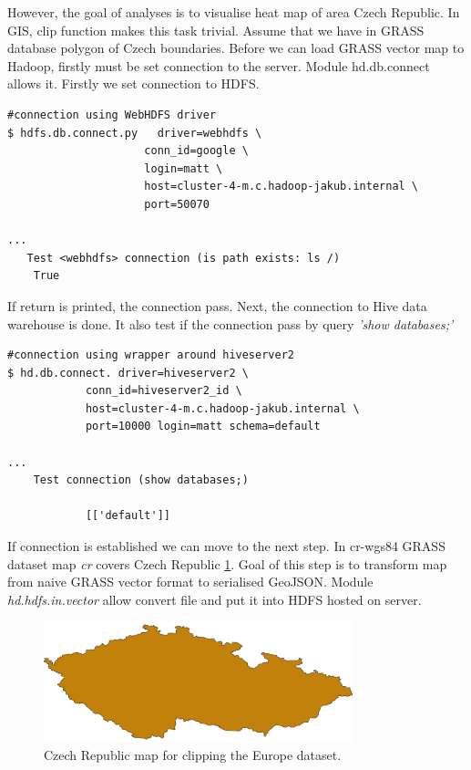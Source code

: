 \documentclass[a4paper,12pt,oneside]{report}
\begin{document}
However, the goal of analyses is to visualise heat map  of area Czech Republic. In GIS, clip function makes this task trivial. Assume that we have in GRASS database polygon of Czech boundaries. Before we can load GRASS vector map to Hadoop, firstly must be set connection to the server. Module hd.db.connect allows it. Firstly we set connection to HDFS.
	\begin{footnotesize}
		\begin{lstlisting}[style=python]
#connection using WebHDFS driver
$ hdfs.db.connect.py   driver=webhdfs \
					 conn_id=google \
					 login=matt \
					 host=cluster-4-m.c.hadoop-jakub.internal \
					 port=50070
	 		
...
   Test <webhdfs> connection (is path exists: ls /) 
    True 
		\end{lstlisting}
	\end{footnotesize}

If return is printed, the connection pass.
Next, the connection to Hive data warehouse is done. It also test if the connection pass by query \textit{'show databases;'}
\begin{footnotesize}
	\begin{lstlisting}[style=python]
#connection using wrapper around hiveserver2
$ hd.db.connect. driver=hiveserver2 \
			conn_id=hiveserver2_id \
	 		host=cluster-4-m.c.hadoop-jakub.internal \
	 		port=10000 login=matt schema=default 
	 		
...
	Test connection (show databases;) 
	
			[['default']]
		\end{lstlisting}
	\end{footnotesize}



If connection is established we can move to the next step. In cr-wgs84 GRASS dataset map \textit{cr} covers Czech Republic \ref{map_cz}. Goal of this step is to transform map from naive GRASS vector format to serialised GeoJSON. Module \textit{hd.hdfs.in.vector} allow convert file and put it into HDFS hosted on server. 
\begin{figure}[!htbp]
	\centering
	\includegraphics[width=0.8\textwidth]{./img/cr.png}
	\caption[GHF workflow]{\centering Czech Republic map for clipping the Europe dataset.
	}
	\label{map_cz}
\end{figure} 
\end{document}
